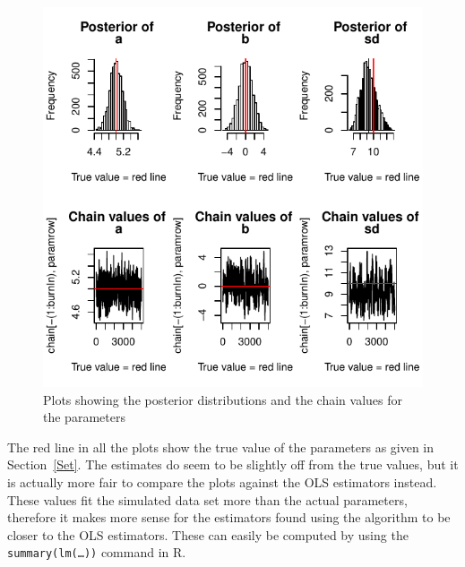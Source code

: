 \documentclass[a4paper,10pt]{article}\usepackage[]{graphicx}\usepackage[]{color}
\makeatletter
\def\maxwidth{ %
  \ifdim\Gin@nat@width>\linewidth
    \linewidth
  \else
    \Gin@nat@width
  \fi
}
\newenvironment{knitrout}{}{} %
\makeatother
\begin{document}
\begin{figure}[H]
\begin{knitrout}
\color{fgcolor}

{\centering \includegraphics[width=\maxwidth]{figure/onesim-1} 

}



\end{knitrout}
\caption{Plots showing the posterior distributions and the chain values for the parameters}\label{res}
\end{figure}

\noindent The red line in all the plots show the true value of the parameters as given in Section~\ref{Set}. The estimates do seem to be slightly off from the true values, but it is actually more fair to compare the plots against the OLS estimators instead. These values fit the simulated data set more than the actual parameters, therefore it makes more sense for the estimators found using the algorithm to be closer to the OLS estimators. These can easily be computed by using the \texttt{summary(lm(\dots))} command in R.
\end{document}
